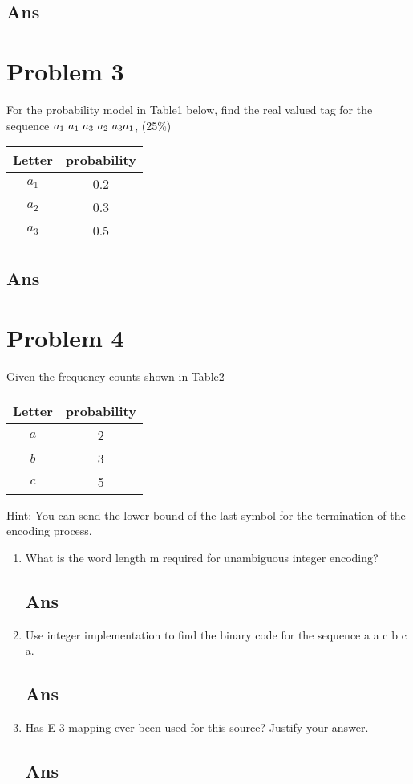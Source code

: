 \documentclass[a4paper, 11pt]{article}
\begin{document}
\subsection*{Ans}

\section*{Problem 3}
For the probability model in Table1 below, find the real valued tag for the sequence 
$a_1~a_1~a_3~a_2~a_3~\\a_1$, (25\%)
\begin{center}
  \begin{tabular}{ |c|c| }
  \hline
   \textbf{Letter} & \textbf{probability}\\
   \hline 
   $a_1$ & 0.2  \\
   \hline
   $a_2$ & 0.3  \\
   \hline
   $a_3$ & 0.5  \\
   \hline
  \end{tabular}
  \end{center}
\subsection*{Ans}

\section*{Problem 4}
Given the frequency counts shown in Table2 \\
\begin{center}
  \begin{tabular}{ |c|c| }
  \hline
   \textbf{Letter} & \textbf{probability}\\
   \hline 
   $a$ & 2  \\
   \hline
   $b$ & 3  \\
   \hline
   $c$ & 5  \\
   \hline
  \end{tabular}
  \end{center}
Hint: You can send the lower bound of the last symbol for the termination of the encoding
process.

\begin{enumerate}[label=(\alph*)]
  \item What is the word length m required for unambiguous integer encoding?
  \subsection*{Ans}
  \item Use integer implementation to find the binary code for the sequence a a c b c a.
  \subsection*{Ans}
  \item Has E 3 mapping ever been used for this source? Justify your answer.
  \subsection*{Ans}
\end{enumerate}
\end{document}
